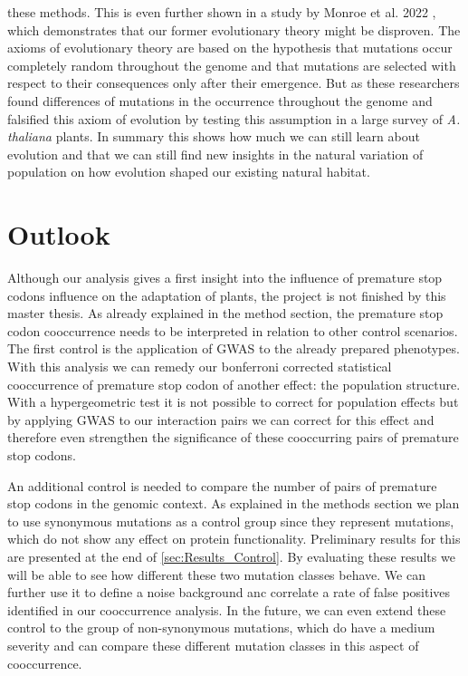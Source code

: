 these methods. This is even further shown in a study by Monroe et al. 2022 \cite{Monroe2022}, which demonstrates that our former evolutionary theory might be disproven. The axioms of evolutionary theory are based on the hypothesis that mutations occur completely random throughout the genome and that mutations are selected with respect to their consequences only after their emergence. But as these researchers found differences of mutations in the occurrence throughout the genome and falsified this axiom of evolution by testing this assumption in a large survey of \textit{A. thaliana} plants. In summary this shows how much we can still learn about evolution and that we can still find new insights in the natural variation of population on how evolution shaped our existing natural habitat.


\chapter{Outlook}
Although our analysis gives a first insight into the influence of premature stop codons influence on the adaptation of plants, the project is not finished by this master thesis. As already explained in the method section, the premature stop codon cooccurrence needs to be interpreted in relation to other control scenarios. The first control is the application of GWAS to the already prepared phenotypes. With this analysis we can remedy our bonferroni corrected statistical cooccurrence of premature stop codon of another effect: the population structure. With a hypergeometric test it is not possible to correct for population effects but by applying GWAS to our interaction pairs we can correct for this effect and therefore even strengthen the significance of these cooccurring pairs of premature stop codons. 

An additional control is needed to compare the number of pairs of premature stop codons in the genomic context. As explained in the methods section we plan to use synonymous mutations as a control group since they represent mutations, which do not show any effect on protein functionality. Preliminary results for this are presented at the end of \autoref{sec:Results_Control}. By evaluating these results we will be able to see how different these two mutation classes behave. We can further use it to define a noise background anc correlate a rate of false positives identified in our cooccurrence analysis. In the future, we can even extend these control to the group of non-synonymous mutations, which do have a medium severity and can compare these different mutation classes in this aspect of cooccurrence. 

